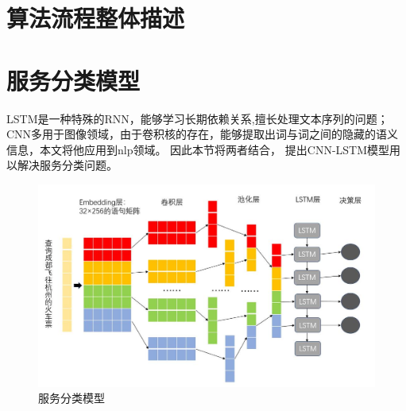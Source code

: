 \section{算法流程整体描述}

\section{服务分类模型}
LSTM是一种特殊的RNN，能够学习长期依赖关系,擅长处理文本序列的问题；CNN多用于图像领域，由于卷积核的存在，能够提取出词与词之间的隐藏的语义信息，本文将他应用到nlp领域。
因此本节将两者结合， 提出CNN-LSTM模型用以解决服务分类问题。

\begin{figure}[htbp]
    \centering
    \includegraphics[scale=0.5]{./images/cnn-lstm.jpg}
    \caption{服务分类模型}
    \label{fig:cnn-lstm}
  \end{figure}









